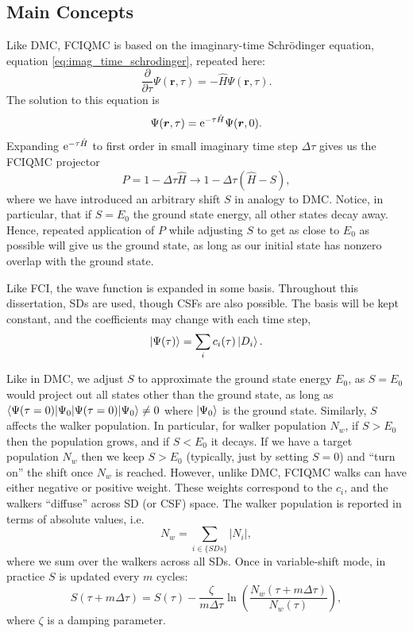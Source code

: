 \subsection{Main Concepts}

Like \gls{DMC}, \gls{FCIQMC} is based on the imaginary-time Schr\"odinger equation, equation \ref{eq:imag_time_schrodinger}, repeated here:
\begin{equation}
    \frac{\partial}{\partial\tau}\Psi(\bm r, \tau) = -\hat H\Psi(\bm r, \tau).
\end{equation}
The solution to this equation is
\begin{equation}
    \Psi(\bm r, \tau) = \mathrm{e}^{-\tau\hat H}\Psi(\bm r, 0).
\end{equation}
Expanding $\mathrm{e}^{-\tau\hat H}$ to first order in small imaginary time step $\Delta\tau$ gives us the FCIQMC projector
\begin{equation}
    \label{eq:fciqmc_projector}
    P = 1-\Delta\tau\hat H \to 1-\Delta\tau(\hat H - S),
\end{equation}
where we have introduced an arbitrary shift $S$ in analogy to \gls{DMC}. Notice, in particular, that if $S=E_0$ the ground state energy, all other states decay away. Hence, repeated application of $P$ while adjusting $S$ to get as close to $E_0$ as possible will give us the ground state, as long as our initial state has nonzero overlap with the ground state.

Like \gls{FCI}, the wave function is expanded in some basis. Throughout this dissertation, \glspl{SD} are used, though \glspl{CSF} are also possible. The basis will be kept constant, and the coefficients may change with each time step,
\begin{equation}
    \ket{\Psi(\tau)} = \sum_i c_i(\tau)\ket{D_i}.
\end{equation}

Like in \gls{DMC}, we adjust $S$ to approximate the ground state energy $E_0$, as $S=E_0$ would project out all states other than the ground state, as long as $\braket{\Psi(\tau=0)|\Psi_0}\neq 0$ where $\ket{\Psi_0}$ is the ground state. Similarly, $S$ affects the walker population. In particular, for walker population $N_w$, if $S>E_0$ then the population grows, and if $S<E_0$ it decays. If we have a target population $N_w$ then we keep $S>E_0$ (typically, just by setting $S=0$) and ``turn on'' the shift once $N_w$ is reached. However, unlike DMC, \gls{FCIQMC} walks can have either negative or positive weight. These weights correspond to the $c_i$, and the walkers ``diffuse'' across \gls{SD} (or \gls{CSF}) space. The walker population is reported in terms of absolute values, i.e.
\begin{equation}
    N_w = \sum_{i\in\{SDs\}}|N_i|,
\end{equation}
where we sum over the walkers across all \glspl{SD}. Once in variable-shift mode, in practice $S$ is updated every $m$ cycles:
\begin{equation}
    S(\tau+m\Delta\tau) = S(\tau) - \frac{\zeta}{m\Delta\tau}\ln\left(\frac{N_w(\tau+m\Delta\tau)}{N_w(\tau)}\right),
\end{equation}
where $\zeta$ is a damping parameter.

